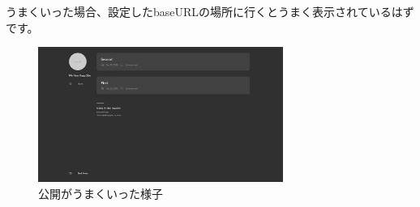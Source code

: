  うまくいった場合、設定したbaseURLの場所に行くとうまく表示されているはずです。

  \begin{figure}[H]
    \centering
    \includegraphics[width=8cm]{./image/02-chap6/view_hugo.png}
    \caption{公開がうまくいった様子}
    \label{chap6-pages3-image}
  \end{figure}



